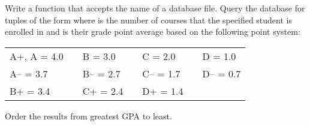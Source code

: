 \begin{problem} %
Write a function that accepts the name of a database file.
Query the database for tuples of the form  where  is the number of courses that the specified student is enrolled in and  is their grade point average based on the following point system:

\begin{center}
\begin{tabular}{lclclcl}
A+, A   = 4.0 & & B   = 3.0 & & C   = 2.0 & & D   = 1.0 \\
    A-- = 3.7 & & B-- = 2.7 & & C-- = 1.7 & & D-- = 0.7 \\
    B+  = 3.4 & & C+  = 2.4 & & D+  = 1.4 & &
\end{tabular}
\end{center}
Order the results from greatest GPA to least.
\end{problem}


